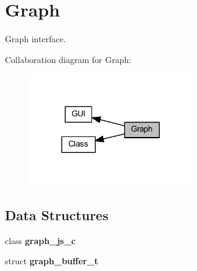 \section{Graph}
\label{group___graph}


Graph interface.  


Collaboration diagram for Graph\+:\nopagebreak
\begin{figure}[H]
\begin{center}
\leavevmode
\includegraphics[width=200pt]{group___graph}
\end{center}
\end{figure}
\subsection*{Data Structures}
\begin{DoxyCompactItemize}
\item 
class \textbf{ graph\+\_\+js\+\_\+c}
\item 
struct \textbf{ graph\+\_\+buffer\+\_\+t}
\end{DoxyCompactItemize}

